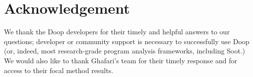\documentclass[conference]{IEEEtran}
\begin{document}
\section*{Acknowledgement} \tiny We thank the Doop developers for their timely and helpful answers to our questions; developer or community support is necessary to successfully use Doop (or, indeed, most research-grade program analysis frameworks, including Soot.)
We would also like to thank Ghafari's team for their timely response and for access to their focal method results. 





%
\end{document}
